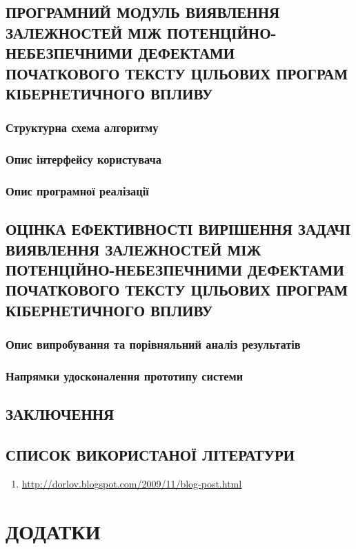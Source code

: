 \documentclass[oneside,final,14pt]{extreport}
\begin{document}
\pagebreak

\section{ПРОГРАМНИЙ МОДУЛЬ ВИЯВЛЕННЯ ЗАЛЕЖНОСТЕЙ МІЖ ПОТЕНЦІЙНО-НЕБЕЗПЕЧНИМИ ДЕФЕКТАМИ ПОЧАТКОВОГО ТЕКСТУ ЦІЛЬОВИХ ПРОГРАМ КІБЕРНЕТИЧНОГО ВПЛИВУ}
\label{3section::doc}\label{3section:id1}

\subsection{Структурна схема алгоритму}
\label{3section:id2}

\subsection{Опис інтерфейсу користувача}
\label{3section:id3}

\subsection{Опис програмної реалізації}
\label{3section:id4}

\pagebreak

\section{ОЦІНКА ЕФЕКТИВНОСТІ ВИРІШЕННЯ ЗАДАЧІ ВИЯВЛЕННЯ ЗАЛЕЖНОСТЕЙ МІЖ ПОТЕНЦІЙНО-НЕБЕЗПЕЧНИМИ ДЕФЕКТАМИ ПОЧАТКОВОГО ТЕКСТУ ЦІЛЬОВИХ ПРОГРАМ КІБЕРНЕТИЧНОГО ВПЛИВУ}
\label{4section::doc}\label{4section:id1}

\subsection{Опис випробування та порівняльний аналіз результатів}
\label{4section:id2}

\subsection{Напрямки удосконалення прототипу системи}
\label{4section:id3}

\section{ЗАКЛЮЧЕННЯ}
\label{5decision::doc}\label{5decision:id1}

\section{СПИСОК ВИКОРИСТАНОЇ ЛІТЕРАТУРИ}
\label{6literature::doc}\label{6literature:id1}\begin{enumerate}
\item {} 
\href{http://dorlov.blogspot.com/2009/11/blog-post.html}{http://dorlov.blogspot.com/2009/11/blog-post.html}

\end{enumerate}


\chapter{ДОДАТКИ}
\label{7addition::doc}\label{7addition:id1}


\end{document}
